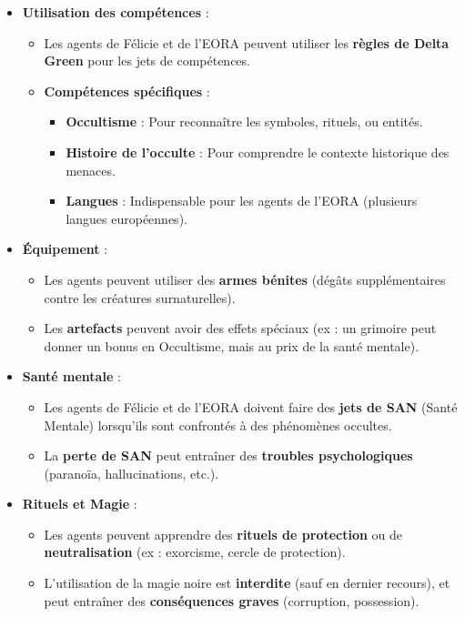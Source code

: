 \documentclass[10pt,a5paper,twoside]{book}
\begin{document}
\begin{itemize}
	\item \textbf{Utilisation des compétences} :
	\begin{itemize}
		\item Les agents de Félicie et de l'EORA peuvent utiliser les \textbf{règles de Delta Green} pour les jets de compétences.
		\item \textbf{Compétences spécifiques} :
		\begin{itemize}
			\item \textbf{Occultisme} : Pour reconnaître les symboles, rituels, ou entités.
			\item \textbf{Histoire de l'occulte} : Pour comprendre le contexte historique des menaces.
			\item \textbf{Langues} : Indispensable pour les agents de l'EORA (plusieurs langues européennes).
		\end{itemize}
	\end{itemize}
	\item \textbf{Équipement} :
	\begin{itemize}
		\item Les agents peuvent utiliser des \textbf{armes bénites} (dégâts supplémentaires contre les créatures surnaturelles).
		\item Les \textbf{artefacts} peuvent avoir des effets spéciaux (ex : un grimoire peut donner un bonus en Occultisme, mais au prix de la santé mentale).
	\end{itemize}
	\item \textbf{Santé mentale} :
	\begin{itemize}
		\item Les agents de Félicie et de l'EORA doivent faire des \textbf{jets de SAN} (Santé Mentale) lorsqu'ils sont confrontés à des phénomènes occultes.
		\item La \textbf{perte de SAN} peut entraîner des \textbf{troubles psychologiques} (paranoïa, hallucinations, etc.).
	\end{itemize}
	\item \textbf{Rituels et Magie} :
	\begin{itemize}
		\item Les agents peuvent apprendre des \textbf{rituels de protection} ou de \textbf{neutralisation} (ex : exorcisme, cercle de protection).
		\item L'utilisation de la magie noire est \textbf{interdite} (sauf en dernier recours), et peut entraîner des \textbf{conséquences graves} (corruption, possession).
	\end{itemize}
\end{itemize}
\end{document}
